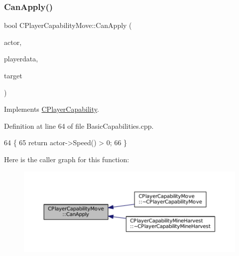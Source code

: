 \hypertarget{classCPlayerCapabilityMove_a76cbb0fa4051961c00e3169d11d76568}{}\label{classCPlayerCapabilityMove_a76cbb0fa4051961c00e3169d11d76568} 
\subsubsection{\texorpdfstring{Can\+Apply()}{CanApply()}}
{\footnotesize\ttfamily bool C\+Player\+Capability\+Move\+::\+Can\+Apply (\begin{DoxyParamCaption}\item[{std\+::shared\+\_\+ptr$<$ \hyperlink{classCPlayerAsset}{C\+Player\+Asset} $>$}]{actor,  }\item[{std\+::shared\+\_\+ptr$<$ \hyperlink{classCPlayerData}{C\+Player\+Data} $>$}]{playerdata,  }\item[{std\+::shared\+\_\+ptr$<$ \hyperlink{classCPlayerAsset}{C\+Player\+Asset} $>$}]{target }\end{DoxyParamCaption})\hspace{0.3cm}{\ttfamily [virtual]}}



Implements \hyperlink{classCPlayerCapability_ae96263e0950f496492f8baeb877b9554}{C\+Player\+Capability}.



Definition at line 64 of file Basic\+Capabilities.\+cpp.


\begin{DoxyCode}
64                                                                                                            
                                                 \{
65     \textcolor{keywordflow}{return} actor->Speed() > 0;
66 \}
\end{DoxyCode}
Here is the caller graph for this function\+:\nopagebreak
\begin{figure}[H]
\begin{center}
\leavevmode
\includegraphics[width=350pt]{classCPlayerCapabilityMove_a76cbb0fa4051961c00e3169d11d76568_icgraph}
\end{center}
\end{figure}
\hypertarget{classCPlayerCapabilityMove_aef25bc0d224e993c46f5cd4cd6b8b7c8}{}\label{classCPlayerCapabilityMove_aef25bc0d224e993c46f5cd4cd6b8b7c8} 
